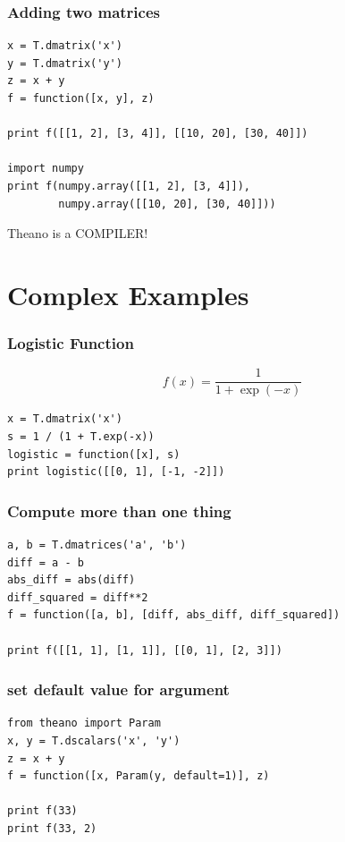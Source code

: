 \documentclass{beamer}
\begin{document}
\begin{frame}[fragile]
  \frametitle{Adding two matrices}

\begin{verbatim}
x = T.dmatrix('x')
y = T.dmatrix('y')
z = x + y
f = function([x, y], z)

print f([[1, 2], [3, 4]], [[10, 20], [30, 40]])

import numpy
print f(numpy.array([[1, 2], [3, 4]]),
        numpy.array([[10, 20], [30, 40]]))
\end{verbatim}
\end{frame}

\begin{frame}
  \Large\centering
  Theano is a COMPILER!
\end{frame}

\section{Complex Examples}

\begin{frame}[fragile]

\frametitle{Logistic Function}
\begin{equation*}
  f(x)=\frac{1}{1+\exp(-x)}
\end{equation*}

\begin{verbatim}
x = T.dmatrix('x')
s = 1 / (1 + T.exp(-x))
logistic = function([x], s)
print logistic([[0, 1], [-1, -2]])
\end{verbatim}
\end{frame}

\begin{frame}[fragile]
  \frametitle{Compute more than one thing}
\begin{verbatim}
a, b = T.dmatrices('a', 'b')
diff = a - b
abs_diff = abs(diff)
diff_squared = diff**2
f = function([a, b], [diff, abs_diff, diff_squared])

print f([[1, 1], [1, 1]], [[0, 1], [2, 3]])
\end{verbatim}
\end{frame}

\begin{frame}[fragile]
  \frametitle{set default value for argument}

\begin{verbatim}
from theano import Param
x, y = T.dscalars('x', 'y')
z = x + y
f = function([x, Param(y, default=1)], z)

print f(33)
print f(33, 2)
\end{verbatim}
\end{frame}
\end{document}
